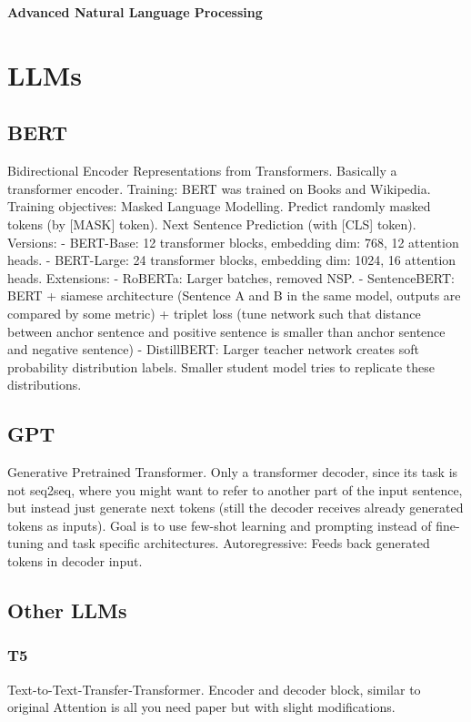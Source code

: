 \documentclass{scrartcl}
\begin{document}
\onehalfspacing
\obeylines
\setlength{\parindent}{0pt}
\begin{center}\LARGE\textbf{Advanced Natural Language Processing}\end{center}

\section{LLMs}
\subsection*{BERT}
Bidirectional Encoder Representations from Transformers.
Basically a transformer encoder.
Training: BERT was trained on Books and Wikipedia.
Training objectives: Masked Language Modelling. Predict randomly masked tokens (by [MASK] token). Next Sentence Prediction (with [CLS] token).
Versions: 
- BERT-Base: 12 transformer blocks, embedding dim: 768, 12 attention heads. 
- BERT-Large: 24 transformer blocks, embedding dim: 1024, 16 attention heads.
Extensions:
- RoBERTa: Larger batches, removed NSP.
- SentenceBERT: BERT + siamese architecture (Sentence A and B in the same model, outputs are compared by some metric) + triplet loss (tune network such that distance between anchor sentence and positive sentence is smaller than anchor sentence and negative sentence)
- DistillBERT: Larger teacher network creates soft probability distribution labels. Smaller student model tries to replicate these distributions.

\subsection*{GPT}
Generative Pretrained Transformer.
Only a transformer decoder, since its task is not seq2seq, where you might want to refer to another part of the input sentence, but instead just generate next tokens (still the decoder receives already generated tokens as inputs).
Goal is to use few-shot learning and prompting instead of fine-tuning and task specific architectures.
Autoregressive: Feeds back generated tokens in decoder input.

\subsection*{Other LLMs}
\subsubsection*{T5}
Text-to-Text-Transfer-Transformer.
Encoder and decoder block, similar to original Attention is all you need paper but with slight modifications.
\end{document}
